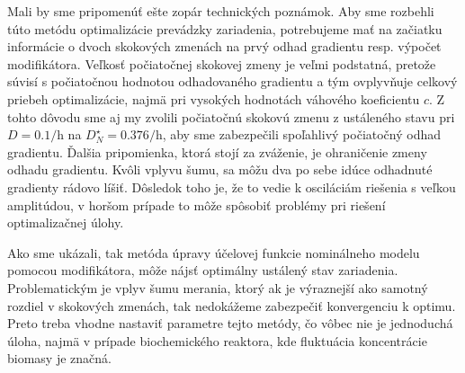 Mali by sme pripomenúť ešte zopár technických poznámok. Aby sme rozbehli túto metódu optimalizácie prevádzky zariadenia, potrebujeme mať na začiatku informácie o dvoch skokových zmenách na prvý odhad gradientu resp. výpočet modifikátora. Veľkosť počiatočnej skokovej zmeny je veľmi podstatná, pretože súvisí s počiatočnou hodnotou odhadovaného gradientu a tým ovplyvňuje celkový priebeh optimalizácie, najmä pri vysokých hodnotách váhového koeficientu $ c $. Z tohto dôvodu sme aj my zvolili počiatočnú skokovú zmenu z ustáleného stavu pri $ D = 0.1\si{\per\hour} $ na $ D_{N}^{\star} = 0.376\si{\per\hour} $, aby sme zabezpečili spoľahlivý počiatočný odhad gradientu. Ďalšia pripomienka, ktorá stojí za zváženie, je ohraničenie zmeny odhadu gradientu. Kvôli vplyvu šumu, sa môžu dva po sebe idúce odhadnuté gradienty rádovo líšiť. Dôsledok toho je, že to vedie k osciláciám riešenia s veľkou amplitúdou, v horšom prípade to môže spôsobiť problémy pri riešení optimalizačnej úlohy. 

Ako sme ukázali, tak metóda úpravy účelovej funkcie nominálneho modelu pomocou modifikátora, môže nájsť optimálny ustálený stav zariadenia. Problematickým je vplyv šumu merania, ktorý ak je výraznejší ako samotný rozdiel v skokových zmenách, tak nedokážeme zabezpečiť konvergenciu k optimu. Preto treba vhodne nastaviť parametre tejto metódy, čo vôbec nie je jednoduchá úloha, najmä v prípade biochemického reaktora, kde fluktuácia koncentrácie biomasy je značná.
